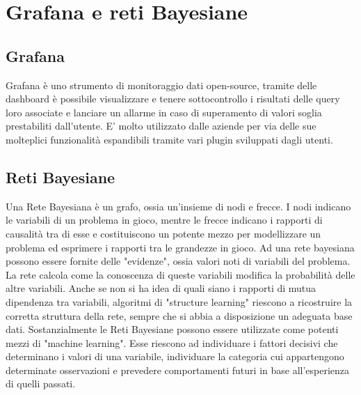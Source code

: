 \section{Grafana e reti Bayesiane}
		\subsection{Grafana}			
Grafana è uno strumento di monitoraggio dati open-source, tramite delle dashboard è possibile visualizzare e tenere sottocontrollo i risultati delle query loro associate e lanciare un allarme in caso di superamento di valori soglia prestabiliti dall'utente. E' molto utilizzato dalle aziende per via delle sue molteplici funzionalità  espandibili tramite vari plugin sviluppati dagli utenti.


		\subsection{Reti Bayesiane}
Una Rete Bayesiana è un grafo, ossia un'insieme di nodi e frecce. I nodi
indicano le variabili di un problema in gioco, mentre le frecce indicano i
rapporti di causalità tra di esse e costituiscono un potente mezzo per
modellizzare un problema ed esprimere i rapporti tra le grandezze in gioco.
Ad una rete bayesiana possono essere fornite delle "evidenze", ossia valori noti di variabili del problema. 
La rete calcola come la conoscenza di queste variabili modifica la probabilità  delle altre variabili.
Anche se non si ha idea di quali siano i rapporti di mutua dipendenza tra
variabili, algoritmi di "structure learning" riescono a ricostruire la corretta struttura della rete, sempre che si abbia a disposizione un adeguata base dati.
Sostanzialmente le Reti Bayesiane possono essere utilizzate come potenti mezzi
di "machine learning". Esse riescono ad individuare i fattori decisivi che
determinano i valori di una variabile, individuare la categoria cui appartengono determinate osservazioni e prevedere comportamenti futuri in base all'esperienza di quelli passati.


\newpage
